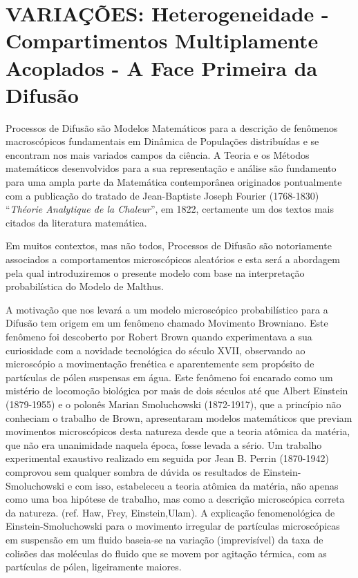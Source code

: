 \section{VARIAÇÕES: Heterogeneidade - Compartimentos Multiplamente Acoplados - A Face Primeira da Difusão}

    Processos de Difusão são Modelos Matemáticos para a descrição de fenômenos macroscópicos fundamentais em Dinâmica de Populações distribuídas e se encontram nos mais variados campos da ciência. A Teoria e os Métodos matemáticos desenvolvidos para a sua representação e análise são fundamento para uma ampla parte da Matemática contemporânea originados pontualmente com a publicação do tratado de Jean-Baptiste Joseph Fourier (1768-1830) ``\textit{Théorie Analytique de la Chaleur}'', em 1822, certamente um dos textos mais citados da literatura matemática. 

    Em muitos contextos, mas não todos, Processos de Difusão são notoriamente associados a comportamentos microscópicos aleatórios e esta será a abordagem pela qual introduziremos o presente modelo com base na interpretação probabilística do Modelo de Malthus. 

    A motivação que nos levará a um modelo microscópico probabilístico para a Difusão tem origem em um fenômeno chamado Movimento Browniano. Este fenômeno foi descoberto por Robert Brown quando experimentava a sua curiosidade com a novidade tecnológica do século XVII, observando ao microscópio a movimentação frenética e aparentemente sem propósito de partículas de pólen suspensas em água. Este fenômeno foi encarado como um mistério de locomoção biológica por mais de dois séculos até que Albert Einstein (1879-1955) e o polonês Marian Smoluchowski (1872-1917), que a princípio não conheciam o trabalho de Brown, apresentaram modelos matemáticos que previam movimentos microscópicos desta natureza desde que a teoria atômica da matéria, que não era unanimidade naquela época, fosse levada a sério. Um trabalho experimental exaustivo realizado em seguida por Jean B. Perrin (1870-1942) comprovou sem qualquer sombra de dúvida os resultados de Einstein-Smoluchowski e com isso, estabeleceu a teoria atômica da matéria, não apenas como uma boa hipótese de trabalho, mas como a descrição microscópica correta da natureza. (ref. Haw, Frey, Einstein,Ulam). A explicação fenomenológica de Einstein-Smoluchowski para o movimento irregular de partículas microscópicas em suspensão em um fluido baseia-se na variação (imprevisível) da taxa de colisões das moléculas do fluido que se movem por agitação térmica, com as partículas de pólen, ligeiramente maiores.

